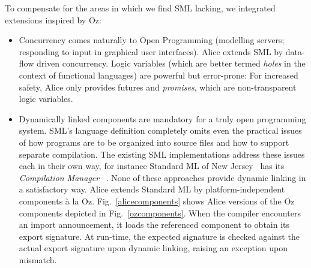 \documentclass{entcs}
\begin{document}
\noindent To compensate for the areas in which we find SML lacking,
we integrated extensions inspired by Oz:
\begin{itemize}
\item Concurrency comes naturally to Open Programming (modelling servers;
  responding to input in graphical user interfaces).  Alice extends SML by
  data-flow driven concurrency.  Logic variables (which are better termed
  \emph{holes} in the context of functional languages) are powerful but
  error-prone:  For increased safety, Alice only provides futures and
  \emph{promises}, which are non-transparent logic variables.
\item Dynamically linked components are mandatory for a truly open
  programming system.  SML's language definition completely omits even
  the practical issues of how programs are to be organized into source
  files and how to support separate compilation.  The existing SML
  implementations address these issues each in their own way, for instance
  Standard ML of New Jersey~\cite{SMLofNJ} has its \emph{Compilation Manager}~%
  \cite{CM}.  None of these approaches provide dynamic linking in a
  satisfactory way.  Alice extends Standard ML by platform-independent
  components \`{a} la Oz.  Fig.~\ref{alicecomponents} shows Alice versions
  of the Oz components depicted in Fig.~\ref{ozcomponents}.  When the compiler
  encounters an import announcement, it loads the referenced component to
  obtain its export signature.  At run-time, the expected signature is checked
  against the actual export signature upon dynamic linking, raising an
  exception upon mismatch.
\end{itemize}
\end{document}
